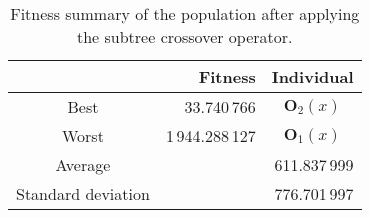 \begin{table}[H]
  \centering
  \begin{tabular}{|c|r|c|}
    \hline
    	& \textbf{Fitness}	& \textbf{Individual}	\\
    \hline
    Best	& 33.740\,766	& \(\mathbf{O}_2(x)\)	\\
    Worst	& 1\,944.288\,127	& \(\mathbf{O}_1(x)\)	\\
    \hline
    \hline
    Average	& \multicolumn{2}{r|}{611.837\,999}	\\
    \hline
    Standard deviation	& \multicolumn{2}{r|}{776.701\,997}	\\
    \hline
  \end{tabular}
  \caption{Fitness summary of the population after applying the subtree crossover operator.}
  \label{tab:bg:gp:variation:crossover:subtree:fitness:summary}
\end{table}